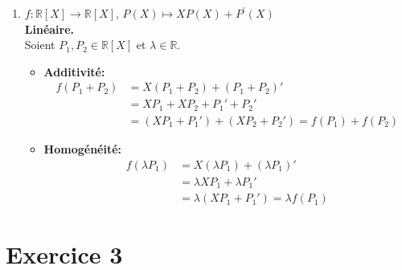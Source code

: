 \documentclass[french]{yLectureNote}
\begin{document}
\begin{enumerate}
    \item $f:\mathbb{R}[X]\rightarrow\mathbb{R}[X]$, $P(X)\mapsto XP(X)+P^{\prime}(X)$ \\
    \textbf{Linéaire.} \\
    Soient $P_1, P_2 \in \mathbb{R}[X]$ et $\lambda \in \mathbb{R}$.
    \begin{itemize}
        \item \textbf{Additivité:}
        \begin{align*}
        f(P_1+P_2) &= X(P_1+P_2) + (P_1+P_2)' \\
        &= XP_1+XP_2+P_1'+P_2' \\
        &= (XP_1+P_1')+(XP_2+P_2') = f(P_1)+f(P_2)
        \end{align*}
        \item \textbf{Homogénéité:}
        \begin{align*}
        f(\lambda P_1) &= X(\lambda P_1) + (\lambda P_1)' \\
        &= \lambda XP_1 + \lambda P_1' \\
        &= \lambda(XP_1+P_1') = \lambda f(P_1)
        \end{align*}
    \end{itemize}
\end{enumerate}
\section{Exercice 3}
\end{document}
